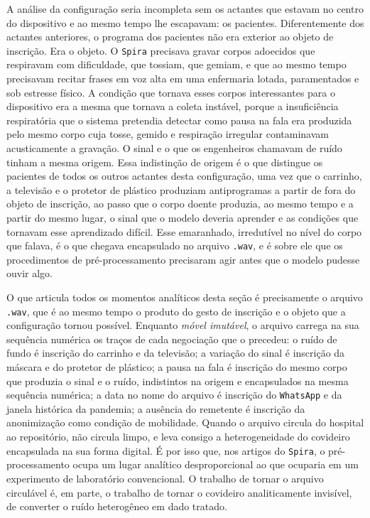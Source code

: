 A análise da configuração seria incompleta sem os actantes que estavam no centro do dispositivo e ao mesmo tempo lhe escapavam: os pacientes. Diferentemente dos actantes anteriores, o programa dos pacientes não era exterior ao objeto de inscrição. Era o objeto. O \texttt{Spira} precisava gravar corpos adoecidos que respiravam com dificuldade, que tossiam, que gemiam, e que ao mesmo tempo precisavam recitar frases em voz alta em uma enfermaria lotada, paramentados e sob estresse físico. A condição que tornava esses corpos interessantes para o dispositivo era a mesma que tornava a coleta instável, porque a insuficiência respiratória que o sistema pretendia detectar como pausa na fala era produzida pelo mesmo corpo cuja tosse, gemido e respiração irregular contaminavam acusticamente a gravação. O sinal e o que os engenheiros chamavam de ruído tinham a mesma origem. Essa indistinção de origem é o que distingue os pacientes de todos os outros actantes desta configuração, uma vez que o carrinho, a televisão e o protetor de plástico produziam antiprogramas a partir de fora do objeto de inscrição, ao passo que o corpo doente produzia, ao mesmo tempo e a partir do mesmo lugar, o sinal que o modelo deveria aprender e as condições que tornavam esse aprendizado difícil. Esse emaranhado, irredutível no nível do corpo que falava, é o que chegava encapsulado no arquivo \texttt{.wav}, e é sobre ele que os procedimentos de pré-processamento precisaram agir antes que o modelo pudesse ouvir algo.

O que articula todos os momentos analíticos desta seção é precisamente o arquivo \texttt{.wav}, que é ao mesmo tempo o produto do gesto de inscrição e o objeto que a configuração tornou possível. Enquanto \textit{móvel imutável}, o arquivo carrega na sua sequência numérica os traços de cada negociação que o precedeu: o ruído de fundo é inscrição do carrinho e da televisão; a variação do sinal é inscrição da máscara e do protetor de plástico; a pausa na fala é inscrição do mesmo corpo que produzia o sinal e o ruído, indistintos na origem e encapsulados na mesma sequência numérica; a data no nome do arquivo é inscrição do \texttt{WhatsApp} e da janela histórica da pandemia; a ausência do remetente é inscrição da anonimização como condição de mobilidade. Quando o arquivo circula do hospital ao repositório, não circula limpo, e leva consigo a heterogeneidade do covideiro encapsulada na sua forma digital. É por isso que, nos artigos do \texttt{Spira}, o pré-processamento ocupa um lugar analítico desproporcional ao que ocuparia em um experimento de laboratório convencional. O trabalho de tornar o arquivo circulável é, em parte, o trabalho de tornar o covideiro analiticamente invisível, de converter o ruído heterogêneo em dado tratado.

